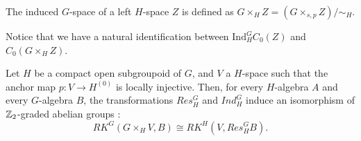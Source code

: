 \begin{definition}
The induced $G$-space of a left $H$-space $Z$ is defined as $ G\times_H Z = (G \times_{s,p} Z) / \sim_H$. 
\end{definition}

Notice that we have a natural identification between $\text{Ind}_H^G C_0(Z)$ and $C_0(G \times_H Z)$.\\

\begin{lem} \label{Restriction} Let $H$ be a compact open subgroupoid of $G$, and $V$ a $H$-space such that the anchor map $p : V\rightarrow H^{(0)}$ is locally injective. Then, for every $H$-algebra $A$ and every $G$-algebra $B$, the transformations $Res_H^G$ and $Ind_H^G$ induce an isomorphism of $\mathbb Z_2$-graded abelian groups :
\[RK^G( G\times_H V, B) \cong RK^H(V, Res_H^G B).\]
\end{lem}

